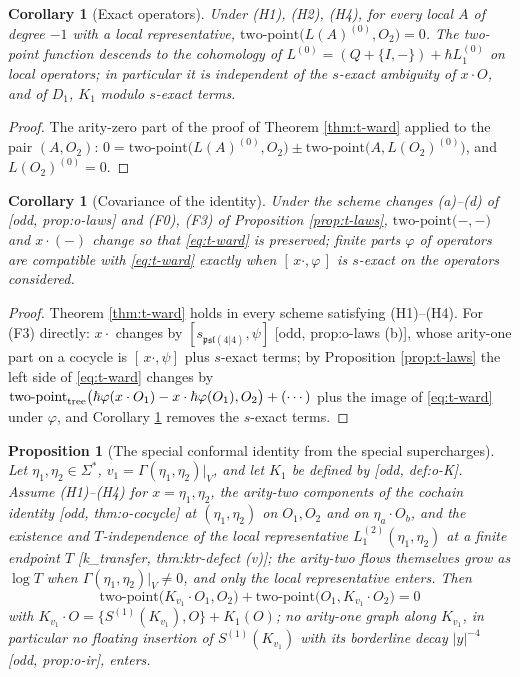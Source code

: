 \documentclass[11pt]{report}
\theoremstyle{plain}
\newtheorem{proposition}[theorem]{Proposition}
\newtheorem{corollary}[theorem]{Corollary}
\theoremstyle{definition}
\numberwithin{equation}{chapter}
\newcommand{\TP}[2]{\mathrm{two\mbox{-}point}\big(#1,#2\big)}
\newcommand{\TPz}[2]{\mathrm{two\mbox{-}point}_{\rm tree}\big(#1,#2\big)}
\begin{document}
\begin{corollary}[Exact operators]
\label{cor:t-exact}
Under (H1), (H2), (H4), for every local $A$ of degree $-1$ with a local representative, $\TP{L(A)^{(0)}}{O_2}=0$. The two-point function descends to the cohomology of $L^{(0)}=(Q+\{I,-\})+\hbar L_1^{(0)}$ on local operators; in particular it is independent of the $s$-exact ambiguity of $x\cdot O$, and of $D_1$, $K_1$ modulo $s$-exact terms.
\end{corollary}

\begin{proof}
The arity-zero part of the proof of Theorem \ref{thm:t-ward} applied to the pair $(A,O_2)$: $0=\TP{L(A)^{(0)}}{O_2}\pm\TP{A}{L(O_2)^{(0)}}$, and $L(O_2)^{(0)}=0$.
\end{proof}

\begin{corollary}[Covariance of the identity]
\label{cor:t-wardcov}
Under the scheme changes (a)--(d) of [odd, prop:o-laws] and (F0), (F3) of Proposition \ref{prop:t-laws}, $\TP{-}{-}$ and $x\cdot(-)$ change so that \eqref{eq:t-ward} is preserved; finite parts $\varphi$ of operators are compatible with \eqref{eq:t-ward} exactly when $[\,x\cdot,\varphi\,]$ is $s$-exact on the operators considered.
\end{corollary}

\begin{proof}
Theorem \ref{thm:t-ward} holds in every scheme satisfying (H1)--(H4). For (F3) directly: $x\cdot$ changes by $[s_{\mathfrak{psl}(4|4)},\psi]$ [odd, prop:o-laws (b)], whose arity-one part on a cocycle is $[\,x\cdot,\psi]$ plus $s$-exact terms; by Proposition \ref{prop:t-laws} the left side of \eqref{eq:t-ward} changes by $\TPz{\hbar\varphi(x\cdot O_1)-x\cdot\hbar\varphi(O_1)}{O_2}+(\cdots)$ plus the image of \eqref{eq:t-ward} under $\varphi$, and Corollary \ref{cor:t-exact} removes the $s$-exact terms.
\end{proof}

\begin{proposition}[The special conformal identity from the special supercharges]
\label{prop:t-K}
Let $\eta_1,\eta_2\in\Sigma^*$, $v_1=\Gamma(\eta_1,\eta_2)|_V$, and let $K_1$ be defined by [odd, def:o-K]. Assume (H1)--(H4) for $x=\eta_1,\eta_2$, the arity-two components of the cochain identity [odd, thm:o-cocycle] at $(\eta_1,\eta_2)$ on $O_1,O_2$ and on $\eta_a\cdot O_b$, and the existence and $T$-independence of the local representative $L_1^{(2)}(\eta_1,\eta_2)$ at a finite endpoint $T$ [k\_transfer, thm:ktr-defect (v)]; the arity-two flows themselves grow as $\log T$ when $\Gamma(\eta_1,\eta_2)|_V\neq0$, and only the local representative enters. Then
\[
\TP{K_{v_1}\cdot O_1}{O_2}+\TP{O_1}{K_{v_1}\cdot O_2}=0
\]
with $K_{v_1}\cdot O=\{S^{(1)}(K_{v_1}),O\}+K_1(O)$; no arity-one graph along $K_{v_1}$, in particular no floating insertion of $S^{(1)}(K_{v_1})$ with its borderline decay $|y|^{-4}$ [odd, prop:o-ir], enters.
\end{proposition}
\end{document}
